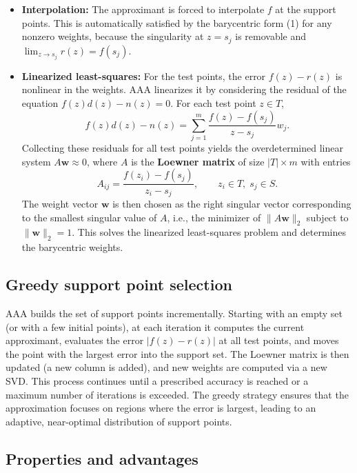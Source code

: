 \documentclass{article}
\begin{document}
\begin{itemize}
\item \textbf{Interpolation:} The approximant is forced to interpolate \(f\) at the support points. This is automatically satisfied by the barycentric form (1) for any nonzero weights, because the singularity at \(z = s_j\) is removable and \(\lim_{z\to s_j} r(z) = f(s_j)\).
\item \textbf{Linearized least-squares:} For the test points, the error \(f(z) - r(z)\) is nonlinear in the weights. AAA linearizes it by considering the residual of the equation \(f(z)d(z) - n(z) = 0\). For each test point \(z \in T\),
\[
f(z)d(z) - n(z) = \sum_{j=1}^{m} \frac{f(z) - f(s_j)}{z - s_j} w_j.
\]
Collecting these residuals for all test points yields the overdetermined linear system \(A\mathbf{w} \approx 0\), where \(A\) is the \textbf{Loewner matrix} of size \(|T| \times m\) with entries
\[
A_{ij} = \frac{f(z_i) - f(s_j)}{z_i - s_j}, \qquad z_i \in T,\; s_j \in S.
\]
The weight vector \(\mathbf{w}\) is then chosen as the right singular vector corresponding to the smallest singular value of \(A\), i.e., the minimizer of \(\|A\mathbf{w}\|_2\) subject to \(\|\mathbf{w}\|_2 = 1\). This solves the linearized least-squares problem and determines the barycentric weights.
\end{itemize}

\subsection{Greedy support point selection}

AAA builds the set of support points incrementally. Starting with an empty set (or with a few initial points), at each iteration it computes the current approximant, evaluates the error \(|f(z) - r(z)|\) at all test points, and moves the point with the largest error into the support set. The Loewner matrix is then updated (a new column is added), and new weights are computed via a new SVD. This process continues until a prescribed accuracy is reached or a maximum number of iterations is exceeded. The greedy strategy ensures that the approximation focuses on regions where the error is largest, leading to an adaptive, near-optimal distribution of support points.

\subsection{Properties and advantages}
\end{document}
